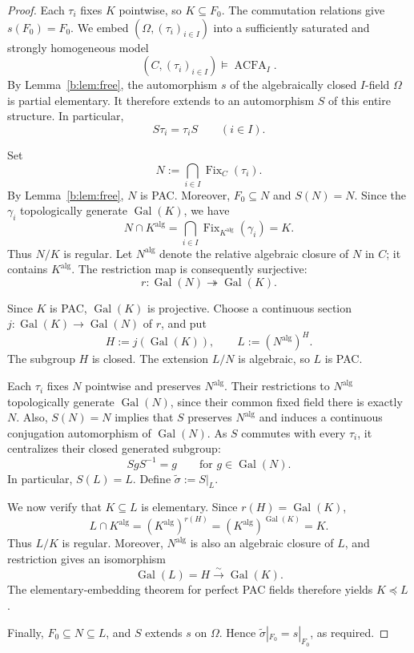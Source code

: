 \documentclass[10pt,a4paper]{amsart}
\theoremstyle{definition}
\newcommand{\alg}{\mathrm{alg}}
\DeclareMathOperator{\Gal}{Gal}
\DeclareMathOperator{\Fix}{Fix}
\begin{document}
\begin{proof}
Each $\tau_i$ fixes $K$ pointwise, so $K\subseteq F_0$.
The commutation relations give $s(F_0)=F_0$. We embed $(\Omega,(\tau_i)_{i\in I})$ into a sufficiently saturated
and strongly homogeneous model
\[
(C,(\tau_i)_{i\in I})\models\operatorname{ACFA}_I.
\]
By Lemma~\ref{b:lem:free}, the automorphism
$s$ of the algebraically closed $I$-field $\Omega$ is partial
elementary. It therefore extends to an automorphism $S$ of
this entire structure. In particular,
\[
S\tau_i=\tau_iS\qquad(i\in I).
\]

Set
\[
N:=\bigcap_{i\in I}\Fix_C(\tau_i).
\]
By Lemma~\ref{b:lem:free}, $N$ is PAC. Moreover,
$F_0\subseteq N$ and $S(N)=N$. Since the $\gamma_i$
topologically generate $\Gal(K)$, we have
\[
N\cap K^{\alg}
=\bigcap_{i\in I}\Fix_{K^{\alg}}(\gamma_i)
=K.
\]
Thus $N/K$ is regular. Let $N^{\alg}$ denote the relative
algebraic closure of $N$ in $C$; it contains $K^{\alg}$.
The restriction map is consequently surjective:
\[
r:\Gal(N)\twoheadrightarrow\Gal(K).
\]

Since $K$ is PAC, $\Gal(K)$ is projective. Choose a continuous
section $j:\Gal(K)\to\Gal(N)$ of $r$, and put
\[
H:=j(\Gal(K)),\qquad L:=(N^{\alg})^H.
\]
The subgroup $H$ is closed. The extension $L/N$ is algebraic,
so $L$ is PAC.

Each $\tau_i$ fixes $N$ pointwise and preserves $N^{\alg}$.
Their restrictions to $N^{\alg}$ topologically generate
$\Gal(N)$, since their common fixed field there is exactly $N$.
Also, $S(N)=N$ implies that $S$ preserves $N^{\alg}$ and
induces a continuous conjugation automorphism of $\Gal(N)$.
As $S$ commutes with every $\tau_i$, it centralizes their
closed generated subgroup:
\[
SgS^{-1}=g\qquad\text{for $g\in\Gal(N)$}.
\]
In particular, $S(L)=L$. Define
$\widetilde\sigma:=S|_L$.

We now verify that $K\subseteq L$ is elementary.
Since $r(H)=\Gal(K)$,
\[
L\cap K^{\alg}
=(K^{\alg})^{r(H)}
=(K^{\alg})^{\Gal(K)}
=K.
\]
Thus $L/K$ is regular. Moreover, $N^{\alg}$ is also an
algebraic closure of $L$, and restriction gives an isomorphism
\[
\Gal(L)=H\xrightarrow{\ \sim\ }\Gal(K).
\]
The elementary-embedding theorem for perfect PAC fields
therefore yields $K\preccurlyeq L$.

Finally, $F_0\subseteq N\subseteq L$, and $S$ extends $s$ on
$\Omega$. Hence $\widetilde\sigma|_{F_0}=s|_{F_0}$, as required.
\end{proof}
\end{document}
